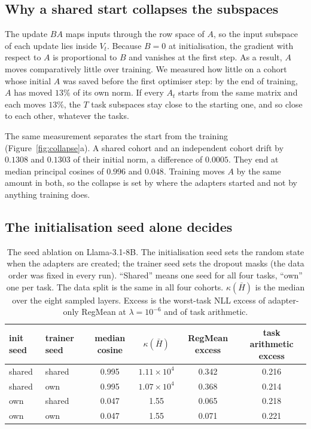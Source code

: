\subsection{Why a shared start collapses the subspaces}\label{subsec:why}

The update $BA$ maps inputs through the row space of $A$, so the input
subspace of each update lies inside $V_t$. Because $B = 0$ at initialisation,
the gradient with respect to $A$ is proportional to $B$ and vanishes at the
first step. As a result, $A$ moves comparatively little over training. We
measured how little on a cohort whose initial $A$ was saved before the first
optimiser step: by the end of training, $A$ has moved $13\%$ of its own norm.
If every $A_t$ starts from the same matrix and each moves $13\%$, the $T$ task
subspaces stay close to the starting one, and so close to each other,
whatever the tasks.

The same measurement separates the start from the training
(Figure~\ref{fig:collapse}a). A shared cohort and an independent cohort drift
by $0.1308$ and $0.1303$ of their initial norm, a difference of $0.0005$. They
end at median principal cosines of $0.996$ and $0.048$. Training moves $A$ by
the same amount in both, so the collapse is set by where the adapters started
and not by anything training does.

\subsection{The initialisation seed alone decides}\label{subsec:seeds}

\begin{table}[pos=tbp]
\centering
\small
\caption{The seed ablation on Llama-3.1-8B. The initialisation seed sets the
random state when the adapters are created; the trainer seed sets the dropout
masks (the data order was fixed in every run). ``Shared'' means one seed for
all four tasks, ``own'' one per task. The data split is the same in all four
cohorts. $\kappa(\bar H)$ is the median over the eight sampled layers. Excess is the
worst-task NLL excess of adapter-only RegMean at $\lambda = 10^{-6}$ and of
task arithmetic.}
\label{tab:seeds}
\begin{tabular}{llcccc}
\toprule
init seed & trainer seed & median cosine & $\kappa(\bar H)$
 & RegMean excess & task arithmetic excess \\
\midrule
shared & shared & 0.995 & $1.11\times10^{4}$ & 0.342 & 0.216 \\
shared & own    & 0.995 & $1.07\times10^{4}$ & 0.368 & 0.214 \\
own    & shared & 0.047 & 1.55 & 0.065 & 0.218 \\
own    & own    & 0.047 & 1.55 & 0.071 & 0.221 \\
\bottomrule
\end{tabular}
\end{table}

